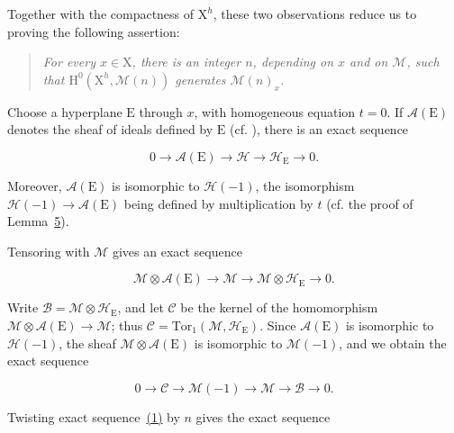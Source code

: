 Together with the compactness of $\mathrm{X}^h$, these two observations reduce us to proving the following assertion:

\begin{quote}
\emph{For every $x\in \mathrm{X}$, there is an integer $n$, depending on $x$ and on $\mathcal{M}$, such that $\mathrm{H}^0(\mathrm{X}^h,\mathcal{M}(n))$ generates $\mathcal{M}(n)_x$.}
\end{quote}

Choose a hyperplane $\mathrm{E}$ through $x$, with homogeneous equation $t=0$. If $\mathcal{A}(\mathrm{E})$ denotes the sheaf of ideals defined by $\mathrm{E}$ (cf. ), there is an exact sequence

\begin{equation*}
0\longrightarrow\mathcal{A}(\mathrm{E})\longrightarrow\mathcal{H}
\longrightarrow\mathcal{H}_\mathrm{E}\longrightarrow0.
\end{equation*}

Moreover, $\mathcal{A}(\mathrm{E})$ is isomorphic to $\mathcal{H}(-1)$, the isomorphism $\mathcal{H}(-1)\to\mathcal{A}(\mathrm{E})$ being defined by multiplication by $t$ (cf. the proof of Lemma~\hyperref[gaga:lemma:5]{5}).

Tensoring with $\mathcal{M}$ gives an exact sequence

\begin{equation*}
\mathcal{M}\otimes\mathcal{A}(\mathrm{E})\longrightarrow\mathcal{M}
\longrightarrow\mathcal{M}\otimes\mathcal{H}_\mathrm{E}\longrightarrow0.
\end{equation*}

Write $\mathcal{B}=\mathcal{M}\otimes\mathcal{H}_\mathrm{E}$, and let $\mathcal{C}$ be the kernel of the homomorphism $\mathcal{M}\otimes\mathcal{A}(\mathrm{E})\to\mathcal{M}$; thus $\mathcal{C}=\mathrm{Tor}_1(\mathcal{M},\mathcal{H}_\mathrm{E})$. Since $\mathcal{A}(\mathrm{E})$ is isomorphic to $\mathcal{H}(-1)$, the sheaf $\mathcal{M}\otimes\mathcal{A}(\mathrm{E})$ is isomorphic to $\mathcal{M}(-1)$, and we obtain the exact sequence

\begin{equation*}\tag{1}
0\longrightarrow\mathcal{C}\longrightarrow\mathcal{M}(-1)
\longrightarrow\mathcal{M}\longrightarrow\mathcal{B}\longrightarrow0.
\end{equation*}

Twisting exact sequence~\hyperref[gaga:eq:1]{(1)} by $n$ gives the exact sequence

